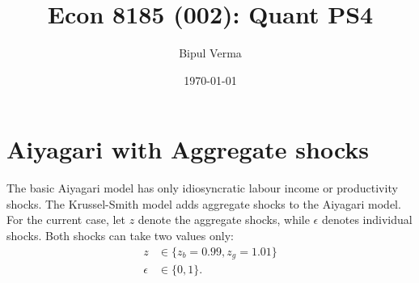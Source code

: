 \documentclass[12pt]{article}
\begin{document}

\title{Econ 8185 (002): Quant PS4}
\author{Bipul Verma}
\date{\today}
\maketitle


\vspace{8cm}



\newpage

\section{Aiyagari with Aggregate shocks}
The basic Aiyagari model has only idiosyncratic labour income or productivity shocks. The Krussel-Smith model adds aggregate shocks to the Aiyagari model. \\
For the current case, let $z$ denote the aggregate shocks, while $\epsilon$ denotes individual shocks. Both shocks can take two values only: \begin{align*}
z & \in \{z_b = 0.99, z_g = 1.01 \} \\
\epsilon & \in \{ 0, 1\}. 
\end{align*}
\end{document}
